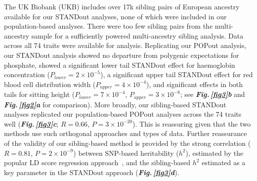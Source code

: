 \documentclass[12pt]{zHenriquesLab-StyleBioRxiv}
\newcommand\dref[2]{\normalsize{\textbf{\textit{Fig.\,\ref{#1}#2}}}\normalsize{}}
\begin{document}
The UK Biobank (UKB) includes over 17k sibling pairs of European ancestry available for our STANDout analyses, 
none of which were included in our population-based analyses. There were too few sibling pairs from the 
multi-ancestry sample for a sufficiently powered multi-ancestry sibling analysis. 
Data across all 74 traits were available for analysis. Replicating our POPout analysis, 
our STANDout analysis showed no departure from polygenic expectations for phosphate, showed 
a significant lower tail STANDout effect for haemoglobin concentration ($P_{lower}=2 \times 10^{-5}$), a 
significant upper tail STANDout effect for red blood cell distribution width ($P_{upper}=4 \times 10^{-4}$), 
and significant effects in both tails for sitting height 
($P_{lower}=7 \times 10^{-4}$, $P_{upper}=3 \times 10^{-8}$; see \dref{fig3}{b} and \dref{fig2}{a} for comparison). 
More broadly, our sibling-based STANDout analyses replicated our population-based POPout analyses across 
the 74 traits well (\dref{fig3}{c}; $R = 0.66$, $P = 3 \times 10^{-20}$). This is reassuring given that the 
two methods use such orthogonal approaches and types of data. Further reassurance of the validity of our 
sibling-based method is provided by the strong correlation ($R = 0.81$, $P = 2 \times 10^{-9}$) between 
SNP-based heritability ($h^2$), estimated by the popular LD score regression approach~\cite{BulikSullivan2015}, 
and the sibling-based $h^2$ estimated as a key parameter in the STANDout approach (\dref{fig3}{d}).

%
\end{document}
